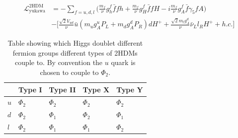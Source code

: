 \begin{equation}
\begin{aligned}
\mathcal{L}^{\text{2HDM}}_{\text{yukawa}} &= - \sum_{f=u,d,l}\Big(\frac{m_{f}}{\nu}g^{f}_{h}\bar{f}fh + \frac{m_{f}}{\nu}g^{f}_{H}\bar{f}fH -i\frac{m_{f}}{\nu}g^{f}_{A}\bar{f}\gamma_{5}fA\Big)  \\ 
&- \Big[\frac{\sqrt{2}V_{ud}}{\nu}\bar{u}(m_{u}g^{u}_{A}P_{L} + m_{d}g^{d}_{A}P_{R})dH^{+} + \frac{\sqrt{2}m_{l}g^{d}_{A}}{\nu}\bar{\nu}_{L}l_{R}H^{+} + h.c.\Big]
\end{aligned}
\end{equation}

\begin{table}[H]
    \centering
    \begin{tabular}{|x{1.0cm}|x{2.0cm}x{2.0cm}x{2.0cm}x{2.0cm}|}
    		\hline
    	 	& Type I & Type II & Type X & Type Y \\
    	 	\hline
    	 	\hline
    	 	$u$ & $\Phi_2$ & $\Phi_2$  & $\Phi_2$  & $\Phi_2$  \\ 
    	 	$d$ & $\Phi_2$ & $\Phi_1$ & $\Phi_2$ & $\Phi_1$ \\
    	 	$l$ & $\Phi_2$ & $\Phi_1$   & $\Phi_1$    & $\Phi_2$ \\
        \hline
    \end{tabular}
    \caption{Table showing which Higgs doublet different fermion groups different types of 2HDMs couple to. By convention the $u$ quark is chosen to couple to $\Phi_2$.}
\end{table}


